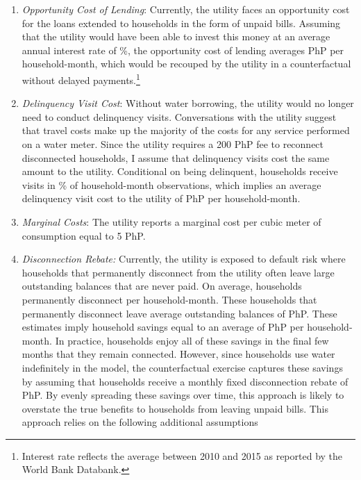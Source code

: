 \documentclass[12pt]{article}
\begin{document}
\begin{enumerate}
\item \textit{Opportunity Cost of Lending}: Currently, the utility faces an opportunity cost for the loans extended to households in the form of unpaid bills.  Assuming that the utility would have been able to invest this money at an average annual interest rate of \unskip\%, the opportunity cost of lending averages PhP per household-month, which would be recouped by the utility in a counterfactual without delayed payments.\footnote{Interest rate reflects the average between 2010 and 2015 as reported by the World Bank Databank.}

\item \textit{Delinquency Visit Cost}: Without water borrowing, the utility would no longer need to conduct delinquency visits.  Conversations with the utility suggest that travel costs make up the majority of the costs for any service performed on a water meter.  Since the utility requires a 200 PhP fee to reconnect disconnected households, I assume that delinquency visits cost the same amount to the utility.  Conditional on being delinquent, households receive visits in \unskip\% of household-month observations, which implies an average delinquency visit cost to the utility of PhP per household-month. 

\item \textit{Marginal Costs}: The utility reports a marginal cost per cubic meter of consumption equal to 5 PhP.

\item \textit{Disconnection Rebate:}  Currently, the utility is exposed to default risk where households that permanently disconnect from the utility often leave large outstanding balances that are never paid.  On average, households permanently disconnect per household-month.  These households that permanently disconnect leave average outstanding balances of PhP.  These estimates imply household savings equal to an average of PhP per household-month.  In practice, households enjoy all of these savings in the final few months that they remain connected.  However, since households use water indefinitely in the model, the counterfactual exercise captures these savings by assuming that households receive a monthly fixed disconnection rebate of PhP.  By evenly spreading these savings over time, this approach is likely to overstate the true benefits to households from leaving unpaid bills.  This approach relies on the following additional assumptions


\end{enumerate}
\end{document}

